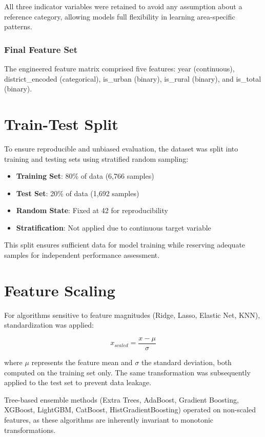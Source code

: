 All three indicator variables were retained to avoid any assumption about a reference category, allowing models full flexibility in learning area-specific patterns.

\subsubsection{Final Feature Set}
The engineered feature matrix comprised five features: year (continuous), district\_encoded (categorical), is\_urban (binary), is\_rural (binary), and is\_total (binary).

\section{Train-Test Split}

To ensure reproducible and unbiased evaluation, the dataset was split into training and testing sets using stratified random sampling:

\begin{itemize}
    \item \textbf{Training Set}: 80\% of data (6,766 samples)
    \item \textbf{Test Set}: 20\% of data (1,692 samples)
    \item \textbf{Random State}: Fixed at 42 for reproducibility
    \item \textbf{Stratification}: Not applied due to continuous target variable
\end{itemize}

This split ensures sufficient data for model training while reserving adequate samples for independent performance assessment.

\section{Feature Scaling}

For algorithms sensitive to feature magnitudes (Ridge, Lasso, Elastic Net, KNN), standardization was applied:

\begin{equation}
    x_{scaled} = \frac{x - \mu}{\sigma}
\end{equation}

where $\mu$ represents the feature mean and $\sigma$ the standard deviation, both computed on the training set only. The same transformation was subsequently applied to the test set to prevent data leakage.

Tree-based ensemble methods (Extra Trees, AdaBoost, Gradient Boosting, XGBoost, LightGBM, CatBoost, HistGradientBoosting) operated on non-scaled features, as these algorithms are inherently invariant to monotonic transformations.

